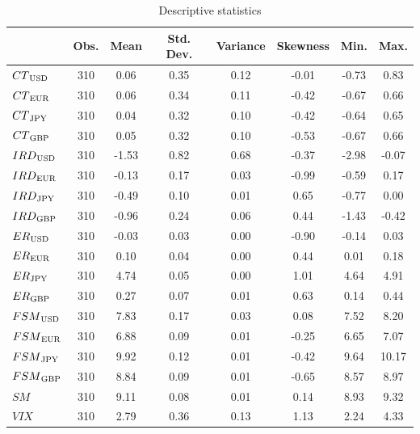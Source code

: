 \documentclass[a4paper, twoside]{templates/ociamthesis}
\begin{document}
\begin{table}[H]
\caption{\label{tab:TableA1}Descriptive statistics}
\centering
\fontsize{10}{12}\selectfont
\begin{tabular}[t]{lccccccc}
\toprule
  & Obs. & Mean & Std. Dev. & Variance & Skewness & Min. & Max.\\
\midrule
$CT\textsubscript{USD}$ & 310 & 0.06 & 0.35 & 0.12 & -0.01 & -0.73 & 0.83\\
$CT\textsubscript{EUR}$ & 310 & 0.06 & 0.34 & 0.11 & -0.42 & -0.67 & 0.66\\
$CT\textsubscript{JPY}$ & 310 & 0.04 & 0.32 & 0.10 & -0.42 & -0.64 & 0.65\\
$CT\textsubscript{GBP}$ & 310 & 0.05 & 0.32 & 0.10 & -0.53 & -0.67 & 0.66\\
\addlinespace
$IRD\textsubscript{USD}$ & 310 & -1.53 & 0.82 & 0.68 & -0.37 & -2.98 & -0.07\\
$IRD\textsubscript{EUR}$ & 310 & -0.13 & 0.17 & 0.03 & -0.99 & -0.59 & 0.17\\
$IRD\textsubscript{JPY}$ & 310 & -0.49 & 0.10 & 0.01 & 0.65 & -0.77 & 0.00\\
$IRD\textsubscript{GBP}$ & 310 & -0.96 & 0.24 & 0.06 & 0.44 & -1.43 & -0.42\\
\addlinespace
$ER\textsubscript{USD}$ & 310 & -0.03 & 0.03 & 0.00 & -0.90 & -0.14 & 0.03\\
$ER\textsubscript{EUR}$ & 310 & 0.10 & 0.04 & 0.00 & 0.44 & 0.01 & 0.18\\
$ER\textsubscript{JPY}$ & 310 & 4.74 & 0.05 & 0.00 & 1.01 & 4.64 & 4.91\\
$ER\textsubscript{GBP}$ & 310 & 0.27 & 0.07 & 0.01 & 0.63 & 0.14 & 0.44\\
\addlinespace
$FSM\textsubscript{USD}$ & 310 & 7.83 & 0.17 & 0.03 & 0.08 & 7.52 & 8.20\\
$FSM\textsubscript{EUR}$ & 310 & 6.88 & 0.09 & 0.01 & -0.25 & 6.65 & 7.07\\
$FSM\textsubscript{JPY}$ & 310 & 9.92 & 0.12 & 0.01 & -0.42 & 9.64 & 10.17\\
$FSM\textsubscript{GBP}$ & 310 & 8.84 & 0.09 & 0.01 & -0.65 & 8.57 & 8.97\\
\addlinespace
$SM$ & 310 & 9.11 & 0.08 & 0.01 & 0.14 & 8.93 & 9.32\\
$VIX$ & 310 & 2.79 & 0.36 & 0.13 & 1.13 & 2.24 & 4.33\\
\bottomrule
\end{tabular}
\end{table}

\clearpage
\end{document}
